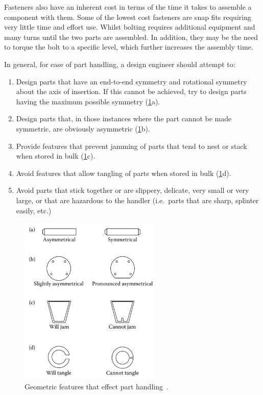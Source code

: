 Fasteners also have an inherent cost in terms of the time it takes to assemble a component with them. Some of the lowest cost fasteners are snap fits requiring very little time and effort use. Whilst bolting requires additional equipment and many turns until the two parts are assembled. In addition, they may be the need to torque the bolt to a specific level, which further increases the assembly time.

In general, for ease of part handling, a design engineer should attempt to:

\begin{enumerate}
    \item Design parts that have an end-to-end symmetry and rotational symmetry about the axis of insertion. If this cannot be achieved, try to design parts having the maximum possible symmetry (\cref{fig-handling}a).
    \item Design parts that, in those instances where the part cannot be made symmetric, are obviously asymmetric (\cref{fig-handling}b).
    \item Provide features that prevent jamming of parts that tend to nest or stack when stored in bulk (\cref{fig-handling}c).
    \item Avoid features that allow tangling of parts when stored in bulk (\cref{fig-handling}d).
    \item Avoid parts that stick together or are slippery, delicate, very small or very large, or that are hazardous to the handler (i.e.\ parts that are sharp, splinter easily, etc.)
\end{enumerate}

\begin{figure}[t!]
    \centering
    \includegraphics[width=0.6\textwidth]{07_design_for_x/handling.png}
    \caption[Geometric features that effect part handling]{Geometric features that effect part handling~\citep{boothroyd2011}.}\label{fig-handling}
\end{figure}

